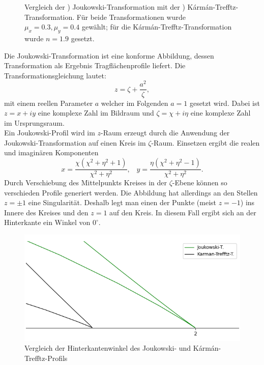 \begin{figure}[]
\begin{subfigure}[b]{0.5\linewidth}
    \caption{\label{fig:karmantrefftztrans}}
  \end{subfigure}
  \caption{Vergleich der ) Joukowski-Transformation mit der ) Kármán-Trefftz-Transformation. Für beide Transformationen wurde $\mu_x = 0.3, \mu_y =0.4$ gewählt; für die Kármán-Trefftz-Transformation wurde $n=1.9$ gesetzt.\label{fig:joukar}}
\end{figure}
Die Joukowski-Transformation ist eine konforme Abbildung, dessen Transformation als Ergebnis Tragflächenprofile liefert. Die Transformationsgleichung lautet:
\begin{equation}
\label{eq:joukowski}
z = \zeta + \frac{a^2}{\zeta},
\end{equation}
mit einem reellen Parameter $a$ welcher im Folgenden $a=1$ gesetzt wird. Dabei ist $z = x + iy$ eine komplexe Zahl im Bildraum und $\zeta = \chi + i \eta$ eine komplexe Zahl im Ursprungsraum. \\
Ein Joukowski-Profil wird im $z$-Raum erzeugt durch die Anwendung der Joukowski-Transformation auf einen Kreis im $\zeta$-Raum. Einsetzen ergibt die realen und imaginären Komponenten
\begin{equation}
x={\frac {\chi \left(\chi ^{2}+\eta ^{2}+1\right)}{\chi ^{2}+\eta ^{2}}}, \;\;\; y={\frac {\eta \left(\chi ^{2}+\eta ^{2}-1\right)}{\chi ^{2}+\eta ^{2}}}.
\end{equation}
Durch Verschiebung des Mittelpunkts Kreises in der $\zeta$-Ebene können so verschieden Profile generiert werden. Die Abbildung hat allerdings an den Stellen $z = \pm 1$ eine Singularität. Deshalb legt man einen der Punkte (meist $z = -1$) ins Innere des Kreises und den $z=1$ auf den Kreis. In diesem Fall ergibt sich an der Hinterkante ein Winkel von $0^{\circ}$. \\
\begin{figure}[!ht]
\begin{center} \includegraphics[scale=0.5]{figures/zoomedjouk.png} \end{center}
\caption{Vergleich der Hinterkantenwinkel des Joukowski- und Kármán-Trefftz-Profils}
\label{fig:zoomedjouk}
\end{figure}

